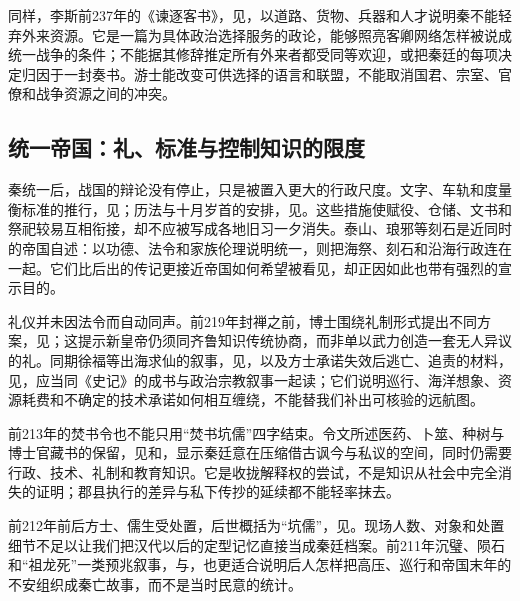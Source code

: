 同样，李斯前237年的《谏逐客书》，见，以道路、货物、兵器和人才说明秦不能轻弃外来资源。它是一篇为具体政治选择服务的政论，能够照亮客卿网络怎样被说成统一战争的条件；不能据其修辞推定所有外来者都受同等欢迎，或把秦廷的每项决定归因于一封奏书。游士能改变可供选择的语言和联盟，不能取消国君、宗室、官僚和战争资源之间的冲突。

\subsection{统一帝国：礼、标准与控制知识的限度}

秦统一后，战国的辩论没有停止，只是被置入更大的行政尺度。文字、车轨和度量衡标准的推行，见；历法与十月岁首的安排，见。这些措施使赋役、仓储、文书和祭祀较易互相衔接，却不应被写成各地旧习一夕消失。泰山、琅邪等刻石是近同时的帝国自述：以功德、法令和家族伦理说明统一，则把海祭、刻石和沿海行政连在一起。它们比后出的传记更接近帝国如何希望被看见，却正因如此也带有强烈的宣示目的。

礼仪并未因法令而自动同声。前219年封禅之前，博士围绕礼制形式提出不同方案，见；这提示新皇帝仍须同齐鲁知识传统协商，而非单以武力创造一套无人异议的礼。同期徐福等出海求仙的叙事，见，以及方士承诺失效后逃亡、追责的材料，见，应当同《史记》的成书与政治宗教叙事一起读；它们说明巡行、海洋想象、资源耗费和不确定的技术承诺如何相互缠绕，不能替我们补出可核验的远航图。

前213年的焚书令也不能只用“焚书坑儒”四字结束。令文所述医药、卜筮、种树与博士官藏书的保留，见和，显示秦廷意在压缩借古讽今与私议的空间，同时仍需要行政、技术、礼制和教育知识。它是收拢解释权的尝试，不是知识从社会中完全消失的证明；郡县执行的差异与私下传抄的延续都不能轻率抹去。

前212年前后方士、儒生受处置，后世概括为“坑儒”，见。现场人数、对象和处置细节不足以让我们把汉代以后的定型记忆直接当成秦廷档案。前211年沉璧、陨石和“祖龙死”一类预兆叙事，与，也更适合说明后人怎样把高压、巡行和帝国末年的不安组织成秦亡故事，而不是当时民意的统计。

